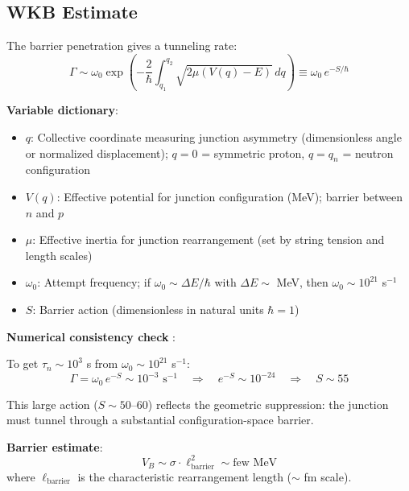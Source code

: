 \subsection{WKB Estimate}

The barrier penetration gives a tunneling rate:
\begin{equation}
\Gamma \sim \omega_0 \exp\left(-\frac{2}{\hbar}\int_{q_1}^{q_2} \sqrt{2\mu(V(q) - E)} \, dq\right)
\equiv \omega_0 \, e^{-S/\hbar}
\label{eq:wkb_rate}
\end{equation}

\textbf{Variable dictionary}:
\begin{itemize}[nosep]
\item $q$: Collective coordinate measuring junction asymmetry (dimensionless angle or
      normalized displacement); $q = 0$ = symmetric proton, $q = q_n$ = neutron configuration
\item $V(q)$: Effective potential for junction configuration (MeV); barrier between $n$ and $p$
\item $\mu$: Effective inertia for junction rearrangement (set by string tension and length scales)
\item $\omega_0$: Attempt frequency; if $\omega_0 \sim \Delta E/\hbar$ with $\Delta E \sim$ MeV,
      then $\omega_0 \sim 10^{21}$ s$^{-1}$
\item $S$: Barrier action (dimensionless in natural units $\hbar = 1$)
\end{itemize}

\textbf{Numerical consistency check} \tagDcApprox{}:

To get $\tau_n \sim 10^3$ s from $\omega_0 \sim 10^{21}$ s$^{-1}$:
\begin{equation}
\Gamma = \omega_0 \, e^{-S} \sim 10^{-3} \text{ s}^{-1}
\quad\Rightarrow\quad
e^{-S} \sim 10^{-24}
\quad\Rightarrow\quad
S \sim 55
\end{equation}

This large action ($S \sim 50$--$60$) reflects the geometric suppression:
the junction must tunnel through a substantial configuration-space barrier.

\textbf{Barrier estimate}:
\begin{equation}
V_B \sim \sigma \cdot \ell_{\text{barrier}}^2 \sim \text{few MeV}
\end{equation}
where $\ell_{\text{barrier}}$ is the characteristic rearrangement length ($\sim$ fm scale).

